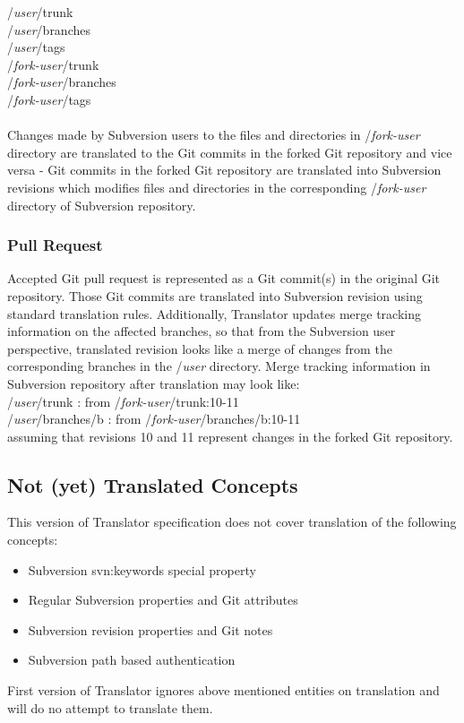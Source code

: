 /\emph{user}/trunk\\
/\emph{user}/branches\\
/\emph{user}/tags\\
/\emph{fork-user}/trunk\\
/\emph{fork-user}/branches\\
/\emph{fork-user}/tags\\\\
Changes made by Subversion users to the files and directories in /\emph{fork-user} directory are translated to the Git commits in the forked Git
repository and vice versa - Git commits in the forked Git repository are translated into Subversion revisions which modifies files
and directories in the corresponding /\emph{fork-user} directory of Subversion repository.

\subsubsection{Pull Request}

Accepted Git pull request is represented as a Git commit(s) in the original Git repository. Those Git commits are translated into Subversion
revision using standard translation rules. Additionally, Translator updates merge tracking information on the affected branches, so that
from the Subversion user perspective, translated revision looks like a merge of changes from the corresponding branches in the /\emph{user} directory. 
Merge tracking information in Subversion repository after translation may look like:\\

/\emph{user}/trunk : from /\emph{fork-user}/trunk:10-11\\
/\emph{user}/branches/b : from /\emph{fork-user}/branches/b:10-11\\

assuming that revisions 10 and 11 represent changes in the forked Git repository.

\subsection{Not (yet) Translated Concepts}
This version of Translator specification does not cover translation of the following concepts:
\begin{itemize}
\item Subversion svn:keywords special property
\item Regular Subversion properties and Git attributes
\item Subversion revision properties and Git notes
\item Subversion path based authentication
\end{itemize}

First version of Translator ignores above mentioned entities on translation and will do no attempt to translate them.